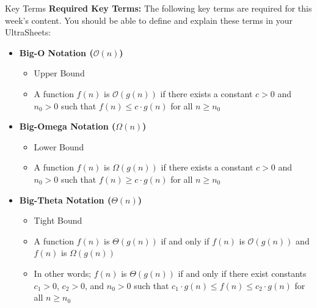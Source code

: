 \documentclass[hyperref={colorlinks,citecolor=blue,linkcolor=blue,urlcolor=blue}, aspectratio=1610]{beamer}
\begin{document}
\begin{frame}{Key Terms}
  \textbf{Required Key Terms:} The following key terms are required for this week's content. You should be able to define and explain these terms in your UltraSheets\texttrademark{}:
    \begin{itemize} 

      \item \textbf{Big-O Notation ($\mathcal{O}(n)$)}
      \begin{itemize}
        \item Upper Bound
        \item A function $f(n)$ is $\mathcal{O}(g(n))$ if there exists a constant $c > 0$ and $n_0 > 0$ such that $f(n) \leq c \cdot g(n)$ for all $n \geq n_0$
      \end{itemize}
      \pause
      \item \textbf{Big-Omega Notation ($\Omega(n)$)}
      \begin{itemize}
        \item Lower Bound
        \item A function $f(n)$ is $\Omega(g(n))$ if there exists a constant $c > 0$ and $n_0 > 0$ such that $f(n) \geq c \cdot g(n)$ for all $n \geq n_0$
      \end{itemize}
      \pause
      \item \textbf{Big-Theta Notation ($\Theta(n)$)}
      \begin{itemize}
        \item Tight Bound
        \item A function $f(n)$ is $\Theta(g(n))$ if and only if $f(n)$ is $\mathcal{O}(g(n))$ and $f(n)$ is $\Omega(g(n))$
        \item In other words; $f(n)$ is $\Theta(g(n))$ if and only if there exist constants $c_1 > 0$, $c_2 > 0$, and $n_0 > 0$ such that $c_1 \cdot g(n) \leq f(n) \leq c_2 \cdot g(n)$ for all $n \geq n_0$
        
      \end{itemize}
    \end{itemize}    
\end{frame}
\end{document}
